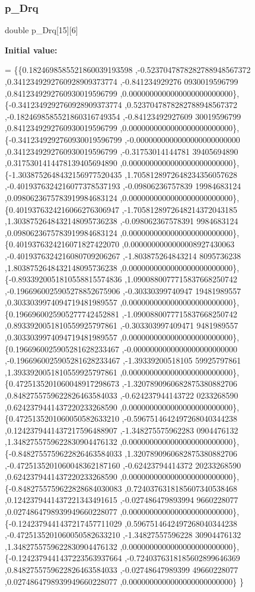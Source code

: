 \subsubsection{\texorpdfstring{p\+\_\+\+Drq}{p\_Drq}}
{\footnotesize\ttfamily double p\+\_\+\+Drq\mbox{[}15\mbox{]}\mbox{[}6\mbox{]}}

{\bfseries Initial value\+:}
\begin{DoxyCode}
= \{\{0.1824698585521860039193598 ,-0.5237047878282788948567372 ,0.3412349292760928909373774 ,-0.841234929276
      0930019596799 ,0.8412349292760930019596799 ,0.0000000000000000000000000\},
\{-0.3412349292760928909373774 ,0.5237047878282788948567372 ,-0.1824698585521860316749354 ,-0.84123492927609
      30019596799 ,0.8412349292760930019596799 ,0.0000000000000000000000000\},
\{-0.3412349292760930019596799 ,-0.0000000000000000000000000 ,0.3412349292760930019596799 ,-0.31753014144781
      39405694890 ,0.3175301414478139405694890 ,0.0000000000000000000000000\},
\{-1.3038752648432156977520435 ,1.7058128972648234356057628 ,-0.4019376324216077378537193 ,-0.09806236757839
      19984683124 ,0.0980623675783919984683124 ,0.0000000000000000000000000\},
\{0.4019376324216066276306947 ,-1.7058128972648214372043185 ,1.3038752648432148095736238 ,-0.098062367578391
      9984683124 ,0.0980623675783919984683124 ,0.0000000000000000000000000\},
\{0.4019376324216071827422070 ,0.0000000000000008927430063 ,-0.4019376324216080709206267 ,-1.803875264843214
      8095736238 ,1.8038752648432148095736238 ,0.0000000000000000000000000\},
\{-0.8933920051810558815574836 ,1.0900880077715837668250742 ,-0.1966960025905278852675906 ,-0.30330399740947
      19481989557 ,0.3033039974094719481989557 ,0.0000000000000000000000000\},
\{0.1966960025905277742452881 ,-1.0900880077715837668250742 ,0.8933920051810559925797861 ,-0.303303997409471
      9481989557 ,0.3033039974094719481989557 ,0.0000000000000000000000000\},
\{0.1966960025905281628233467 ,-0.0000000000000000000000000 ,-0.1966960025905281628233467 ,-1.39339200518105
      59925797861 ,1.3933920051810559925797861 ,0.0000000000000000000000000\},
\{0.4725135201060048917298673 ,-1.3207890960682875380882706 ,0.8482755759622826463584033 ,-0.624237944143722
      0233268590 ,0.6242379441437220233268590 ,0.0000000000000000000000000\},
\{0.4725135201060050582633210 ,-0.5967514642497268040344238 ,0.1242379441437217596488907 ,-1.348275575962283
      0904476132 ,1.3482755759622830904476132 ,0.0000000000000000000000000\},
\{-0.8482755759622826463584033 ,1.3207890960682875380882706 ,-0.4725135201060048362187160 ,-0.62423794414372
      20233268590 ,0.6242379441437220233268590 ,0.0000000000000000000000000\},
\{-0.8482755759622828684030083 ,0.7240376318185607340538468 ,0.1242379441437221343491615 ,-0.027486479893994
      9660228077 ,0.0274864798939949660228077 ,0.0000000000000000000000000\},
\{-0.1242379441437217457711029 ,0.5967514642497268040344238 ,-0.4725135201060050582633210 ,-1.34827557596228
      30904476132 ,1.3482755759622830904476132 ,0.0000000000000000000000000\},
\{-0.1242379441437223563937664 ,-0.7240376318185602899646369 ,0.8482755759622826463584033 ,-0.02748647989399
      49660228077 ,0.0274864798939949660228077 ,0.0000000000000000000000000\}
\}
\end{DoxyCode}
